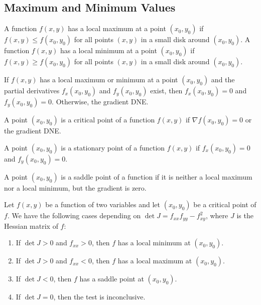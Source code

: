\documentclass[11pt]{article}
\begin{document}
\subsection{Maximum and Minimum Values}
\begin{definition}
    A function $f(x, y)$ has a local maximum at a point $(x_0, y_0)$ if $f(x, y) \le f(x_0, y_0)$ for all points $(x, y)$ in a small disk around $(x_0, y_0)$. A function $f(x, y)$ has a local minimum at a point $(x_0, y_0)$ if $f(x, y) \ge f(x_0, y_0)$ for all points $(x, y)$ in a small disk around $(x_0, y_0)$.
\end{definition}
\begin{theorem}
    If $f(x, y)$ has a local maximum or minimum at a point $(x_0, y_0)$ and the partial derivatives $f_x(x_0, y_0)$ and $f_y(x_0, y_0)$ exist, then $f_x(x_0, y_0) = 0$ and $f_y(x_0, y_0) = 0$. Otherwise, the gradient DNE.
\end{theorem}
\begin{definition}
    A point $(x_0, y_0)$ is a critical point of a function $f(x, y)$ if $\nabla f(x_0, y_0) = 0$ or the gradient DNE.
\end{definition}
\begin{definition}
    A point $(x_0, y_0)$ is a stationary point of a function $f(x, y)$ if $f_x(x_0, y_0) = 0$ and $f_y(x_0, y_0) = 0$.
\end{definition}
\begin{definition}
    A point $(x_0, y_0)$ is a saddle point of a function if it is neither a local maximum nor a local minimum, but the gradient is zero.
\end{definition}
\begin{theorem}
    Let $f(x, y)$ be a function of two variables and let $(x_0, y_0)$ be a critical point of $f$. We have the following cases depending on $\det{J} = f_{xx}f_{yy} - f_{xy}^2$, where $J$ is the Hessian matrix of $f$:
    \begin{enumerate}
        \item If $\det{J} > 0$ and $f_{xx} > 0$, then $f$ has a local minimum at $(x_0, y_0)$.
        \item If $\det{J} > 0$ and $f_{xx} < 0$, then $f$ has a local maximum at $(x_0, y_0)$.
        \item If $\det{J} < 0$, then $f$ has a saddle point at $(x_0, y_0)$.
        \item If $\det{J} = 0$, then the test is inconclusive.
    \end{enumerate} 
\end{theorem}
\end{document}
